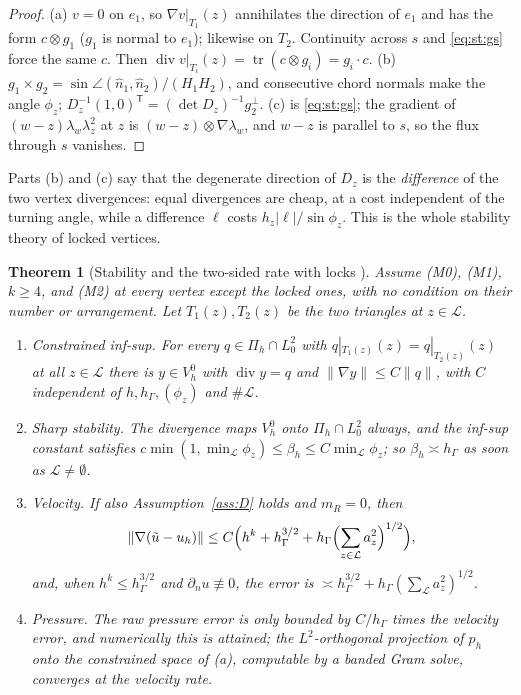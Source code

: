 \documentclass[pdflatex,sn-mathphys-num]{sn-jnl}
\theoremstyle{thmstyleone}
\newtheorem{theorem}{Theorem}[section]
\theoremstyle{thmstylethree}
\newcommand{\hG}{h_\Gamma}
\newcommand{\VO}{V_h^0}
\newcommand{\Pih}{\Pi_h}
\newcommand{\dn}{\partial_n}
\newcommand{\ut}{\tilde u}
\newcommand{\norm}[1]{\lVert #1\rVert}
\renewcommand{\div}{\operatorname{div}}
\newcommand{\Lk}{\mathcal L}
\begin{document}
\begin{proof}
(a) $v=0$ on $e_1$, so $\nabla v|_{T_1}(z)$ annihilates the direction of $e_1$ and has the form $c\otimes g_1$ ($g_1$ is normal to $e_1$); likewise on $T_2$. Continuity across $s$ and \eqref{eq:st:gs} force the same $c$. Then $\div v|_{T_i}(z)=\operatorname{tr}(c\otimes g_i)=g_i\cdot c$. (b) $g_1\times g_2=\sin\angle(\hat n_1,\hat n_2)/(H_1H_2)$, and consecutive chord normals make the angle $\phi_z$; $D_z^{-1}(1,0)^{\mathsf T}=(\det D_z)^{-1}g_2^\perp$. (c) is \eqref{eq:st:gs}; the gradient of $(w-z)\lambda_w\lambda_z^2$ at $z$ is $(w-z)\otimes\nabla\lambda_w$, and $w-z$ is parallel to $s$, so the flux through $s$ vanishes.
\end{proof}

Parts (b) and (c) say that the degenerate direction of $D_z$ is the \emph{difference} of the two vertex divergences: equal divergences are cheap, at a cost independent of the turning angle, while a difference $\ell$ costs $h_z|\ell|/\sin\phi_z$. This is the whole stability theory of locked vertices.

\begin{theorem}[Stability and the two-sided rate with locks {\cite{PadhiExt}}]\label{thm:st:locks}
Assume (M0), (M1), $k\ge4$, and (M2) at every vertex except the locked ones, with no condition on their number or arrangement. Let $T_1(z),T_2(z)$ be the two triangles at $z\in\Lk$.
\begin{enumerate}[label=(\alph*)]
\item \emph{Constrained inf-sup.} For every $q\in\Pih\cap L^2_0$ with $q|_{T_1(z)}(z)=q|_{T_2(z)}(z)$ at all $z\in\Lk$ there is $y\in\VO$ with $\div y=q$ and $\norm{\nabla y}\le C\norm q$, with $C$ independent of $h,\hG,(\phi_z)$ and $\#\Lk$.
\item \emph{Sharp stability.} The divergence maps $\VO$ onto $\Pih\cap L^2_0$ always, and the inf-sup constant satisfies $c\min(1,\min_{\Lk}\phi_z)\le\beta_h\le C\min_{\Lk}\phi_z$; so $\beta_h\asymp\hG$ as soon as $\Lk\ne\emptyset$.
\item \emph{Velocity.} If also Assumption~\ref{ass:D} holds and $m_R=0$, then
\[
\norm{\nabla(\ut-u_h)}\le C\Bigl(h^k+\hG^{3/2}+\hG\Bigl(\sum_{z\in\Lk}a_z^2\Bigr)^{1/2}\Bigr),
\]
and, when $h^k\le\hG^{3/2}$ and $\dn u\not\equiv0$, the error is $\asymp\hG^{3/2}+\hG(\sum_{\Lk}a_z^2)^{1/2}$.
\item \emph{Pressure.} The raw pressure error is only bounded by $C/\hG$ times the velocity error, and numerically this is attained; the $L^2$-orthogonal projection of $p_h$ onto the constrained space of (a), computable by a banded Gram solve, converges at the velocity rate.
\end{enumerate}
\end{theorem}
\end{document}
